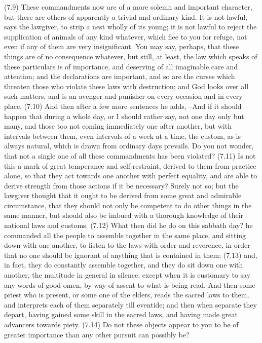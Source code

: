 (7.9) These commandments now are of a more solemn and important character, but there are others of
apparently a trivial and ordinary kind. It is not lawful, says the lawgiver, to strip a nest wholly of its
young; it is not lawful to reject the supplication of animals of any kind whatever, which flee to you for
refuge, not even if any of them are very insignificant. You may say, perhaps, that these things are of no
consequence whatever, but still, at least, the law which speaks of these particulars is of importance, and
deserving of all imaginable care and attention; and the declarations are important, and so are the
curses which threaten those who violate these laws with destruction; and God looks over all such
matters, and is an avenger and punisher on every occasion and in every place. (7.10) And then after a
few more sentences he adds, --And if it should happen that during a whole day, or I should rather say,
not one day only but many, and those too not coming immediately one after another, but with intervals
between them, even intervals of a week at a time, the custom, as is always natural, which is drawn from
ordinary days prevails. Do you not wonder, that not a single one of all these commandments has been
violated? (7.11) Is not this a mark of great temperance and self-restraint, derived to them from practice
alone, so that they act towards one another with perfect equality, and are able to derive strength from
those actions if it be necessary? Surely not so; but the lawgiver thought that it ought to be derived from
some great and admirable circumstance, that they should not only be competent to do other things in
the same manner, but should also be imbued with a thorough knowledge of their national laws and
customs. (7.12) What then did he do on this sabbath day? he commanded all the people to assemble
together in the same place, and sitting down with one another, to listen to the laws with order and
reverence, in order that no one should be ignorant of anything that is contained in them; (7.13) and, in
fact, they do constantly assemble together, and they do sit down one with another, the multitude in
general in silence, except when it is customary to say any words of good omen, by way of assent to what
is being read. And then some priest who is present, or some one of the elders, reads the sacred laws to
them, and interprets each of them separately till eventide; and then when separate they depart, having
gained some skill in the sacred laws, and having made great advancers towards piety. (7.14) Do not
these objects appear to you to be of greater importance than any other pursuit can possibly be?
